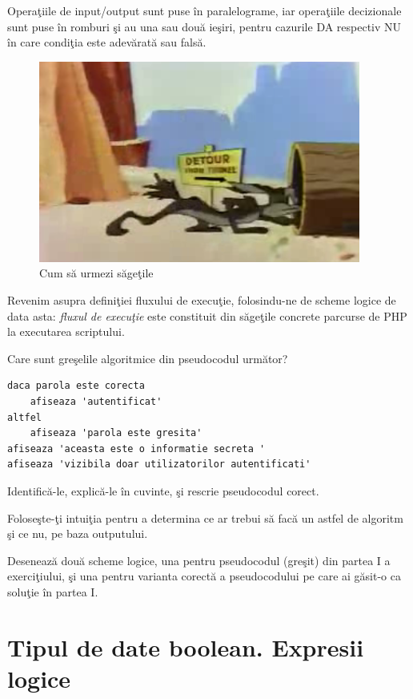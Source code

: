 Operaţiile de input/output sunt puse în paralelograme,
iar operaţiile decizionale sunt puse în romburi şi au
una sau două ieşiri, pentru cazurile {\glqq}DA{\grqq} respectiv {\glqq}NU{\grqq}
în care condiţia este adevărată sau falsă.

\begin{figure}[h!]
  \centering
    \includegraphics[scale=.8]{cap02/coyote-arrow.png}
  \caption{Cum să urmezi săgeţile}
  \label{fig:coyote arrow}
\end{figure}

Revenim asupra definiţiei fluxului de execuţie, folosindu-ne de scheme logice de data asta:
\textit{fluxul de execuţie} este constituit din săgeţile concrete parcurse de PHP
la executarea scriptului.

\begin{Exercise}[difficulty=2,title={Găseşte eroarea de logică}]
\ExePart
Care sunt greşelile algoritmice din pseudocodul următor?

\begin{lstlisting}[language=pseudocod]
daca parola este corecta
	afiseaza 'autentificat'
altfel
	afiseaza 'parola este gresita'
afiseaza 'aceasta este o informatie secreta '
afiseaza 'vizibila doar utilizatorilor autentificati'
\end{lstlisting}

Identifică-le, explică-le în cuvinte, şi rescrie pseudocodul corect.

Foloseşte-ţi intuiţia pentru a determina ce ar trebui
să facă un astfel de algoritm şi ce nu, pe baza outputului.

\ExePart
Desenează două scheme logice, una pentru pseudocodul (greşit)
din partea I a exerciţiului, şi una pentru varianta corectă
a pseudocodului pe care ai găsit-o ca soluţie în partea I.
\end{Exercise}


\section{Tipul de date boolean. Expresii logice}
\label{sec:tipul de date boolean. Expresii logice}

